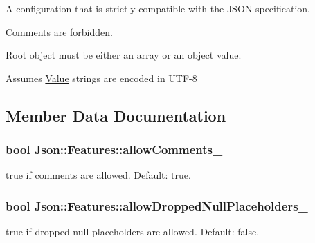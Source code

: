 A configuration that is strictly compatible with the J\+S\+ON specification. 


\begin{DoxyItemize}
\item Comments are forbidden.
\item Root object must be either an array or an object value.
\item Assumes \hyperlink{classJson_1_1Value}{Value} strings are encoded in U\+T\+F-\/8 
\end{DoxyItemize}

\subsection{Member Data Documentation}
\subsubsection[{\texorpdfstring{allow\+Comments\+\_\+}{allowComments_}}]{\setlength{\rightskip}{0pt plus 5cm}bool Json\+::\+Features\+::allow\+Comments\+\_\+}\hypertarget{classJson_1_1Features_a33afd389719624b6bdb23950b3c346c9}{}\label{classJson_1_1Features_a33afd389719624b6bdb23950b3c346c9}


{\ttfamily true} if comments are allowed. Default\+: {\ttfamily true}. 

\subsubsection[{\texorpdfstring{allow\+Dropped\+Null\+Placeholders\+\_\+}{allowDroppedNullPlaceholders_}}]{\setlength{\rightskip}{0pt plus 5cm}bool Json\+::\+Features\+::allow\+Dropped\+Null\+Placeholders\+\_\+}\hypertarget{classJson_1_1Features_a5076aa72c05c7596ac339ede36c97a6a}{}\label{classJson_1_1Features_a5076aa72c05c7596ac339ede36c97a6a}


{\ttfamily true} if dropped null placeholders are allowed. Default\+: {\ttfamily false}. 

